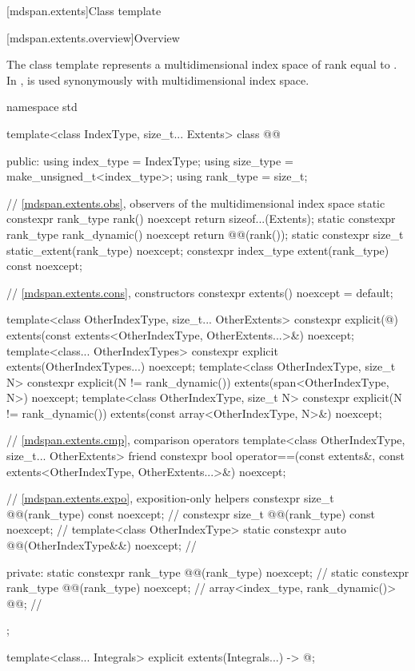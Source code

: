 [mdspan.extents]{Class template }

[mdspan.extents.overview]{Overview}

The class template  represents
a multidimensional index space of rank equal to .
In ,
 is used synonymously with multidimensional index space.

\begin{codeblock}
namespace std {
  template<class IndexType, size_t... Extents>
  class @@ {
  public:
    using index_type = IndexType;
    using size_type = make_unsigned_t<index_type>;
    using rank_type = size_t;

    // \ref{mdspan.extents.obs}, observers of the multidimensional index space
    static constexpr rank_type rank() noexcept { return sizeof...(Extents); }
    static constexpr rank_type rank_dynamic() noexcept { return @@(rank()); }
    static constexpr size_t static_extent(rank_type) noexcept;
    constexpr index_type extent(rank_type) const noexcept;

    // \ref{mdspan.extents.cons}, constructors
    constexpr extents() noexcept = default;

    template<class OtherIndexType, size_t... OtherExtents>
      constexpr explicit(@\seebelow@)
        extents(const extents<OtherIndexType, OtherExtents...>&) noexcept;
    template<class... OtherIndexTypes>
      constexpr explicit extents(OtherIndexTypes...) noexcept;
    template<class OtherIndexType, size_t N>
      constexpr explicit(N != rank_dynamic())
        extents(span<OtherIndexType, N>) noexcept;
    template<class OtherIndexType, size_t N>
      constexpr explicit(N != rank_dynamic())
        extents(const array<OtherIndexType, N>&) noexcept;

    // \ref{mdspan.extents.cmp}, comparison operators
    template<class OtherIndexType, size_t... OtherExtents>
      friend constexpr bool operator==(const extents&,
                                       const extents<OtherIndexType, OtherExtents...>&) noexcept;

    // \ref{mdspan.extents.expo}, exposition-only helpers
    constexpr size_t @@(rank_type) const noexcept;     // \expos
    constexpr size_t @@(rank_type) const noexcept;     // \expos
    template<class OtherIndexType>
      static constexpr auto @@(OtherIndexType&&) noexcept;      // \expos

  private:
    static constexpr rank_type @@(rank_type) noexcept;       // \expos
    static constexpr rank_type @@(rank_type) noexcept;   // \expos
    array<index_type, rank_dynamic()> @@{};                // \expos
  };

  template<class... Integrals>
    explicit extents(Integrals...)
      -> @\seebelow@;
}
\end{codeblock}

